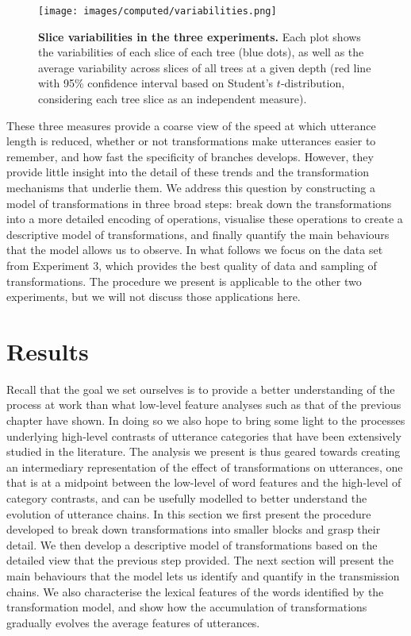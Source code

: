 \documentclass[a4paper,fleqn]{cas-dc}
\begin{document}
\begin{figure}
  \centering
  \texttt{[image: images/computed/variabilities.png]}
  \caption[Slice variabilities in the three experiments]{
  \textbf{Slice variabilities in the three experiments.}
  Each plot shows the variabilities of each slice of each tree (blue dots), as well as the average variability across slices of all trees at a given depth (red line with 95\% confidence interval based on Student's $t$-distribution, considering each tree slice as an independent measure).
  }
  \label{fig:gistr-variabilities}
\end{figure}

These three measures provide a coarse view of the speed at which
utterance length is reduced, whether or not transformations make
utterances easier to remember, and how fast the specificity of branches
develops. However, they provide little insight into the detail of these
trends and the transformation mechanisms that underlie them. We address
this question by constructing a model of transformations in three broad
steps: break down the transformations into a more detailed encoding of
operations, visualise these operations to create a descriptive model of
transformations, and finally quantify the main behaviours that the model
allows us to observe. In what follows we focus on the data set from
Experiment 3, which provides the best quality of data and sampling of
transformations. The procedure we present is applicable to the other two
experiments, but we will not discuss those applications here.



\section{Results}\label{sec:gistr-results}

Recall that the goal we set ourselves is to provide a better
understanding of the process at work than what low-level feature
analyses such as that of the previous chapter have shown. In doing so we
also hope to bring some light to the processes underlying high-level
contrasts of utterance categories that have been extensively studied in
the literature. The analysis we present is thus geared towards creating
an intermediary representation of the effect of transformations on
utterances, one that is at a midpoint between the low-level of word
features and the high-level of category contrasts, and can be usefully
modelled to better understand the evolution of utterance chains.
In this section we first present the procedure developed to break down transformations into smaller blocks and grasp
their detail. We then develop a descriptive model of transformations
based on the detailed view that the previous step provided.
The next section will present the main behaviours that the model lets
us identify and quantify in the transmission chains. We also characterise the
lexical features of the words identified by the transformation model,
and show how the accumulation of transformations gradually evolves the
average features of utterances.
\end{document}
